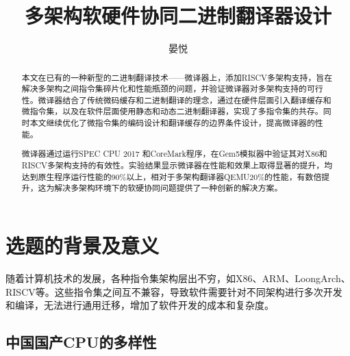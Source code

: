 \documentclass{Style/ucasproposal}%
\title{多架构软硬件协同二进制翻译器设计}%
\author{晏悦}%
\institute{中国科学院计算技术研究所}%
\begin{document}

\maketitle%
\tableofcontents%
\clearpage
{}%

\begin{abstract}
  本文在已有的一种新型的二进制翻译技术——微译器上，添加RISCV多架构支持，旨在解决多架构之间指令集碎片化和性能瓶颈的问题，并验证微译器对多架构支持的可行性。微译器结合了传统微码缓存和二进制翻译的理念，通过在硬件层面引入翻译缓存和微指令集，以及在软件层面使用静态和动态二进制翻译器，实现了多指令集的共存。同时本文继续优化了微指令集的编码设计和翻译缓存的边界条件设计，提高微译器的性能。
  
  微译器通过运行SPEC CPU 2017 和CoreMark程序，在Gem5模拟器中验证其对X86和RISCV多架构支持的有效性。实验结果显示微译器在性能和效果上取得显著的提升，均达到原生程序运行性能的90\%以上，相对于多架构翻译器QEMU20\%的性能，有数倍提升，这为解决多架构环境下的软硬协同问题提供了一种创新的解决方案。
  \end{abstract}
  

\section{选题的背景及意义}

随着计算机技术的发展，各种指令集架构层出不穷，如X86、ARM、LoongArch\cite{LoongArch2023}、RISCV等。这些指令集之间互不兼容，导致软件需要针对不同架构进行多次开发和编译，无法进行通用迁移，增加了软件开发的成本和复杂度。

\subsection{中国国产CPU的多样性}
\end{document}
